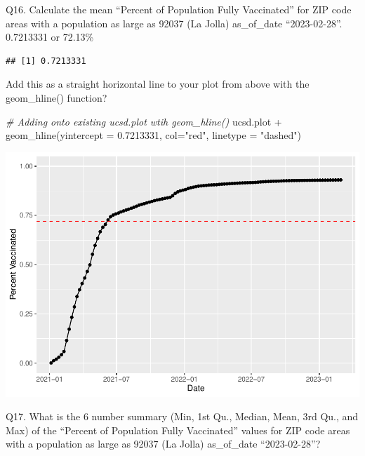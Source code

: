 \documentclass[
]{article}
\newenvironment{Shaded}{\begin{snugshade}}{\end{snugshade}}
\newcommand{\AttributeTok}[1]{\textcolor[rgb]{0.77,0.63,0.00}{#1}}
\newcommand{\CommentTok}[1]{\textcolor[rgb]{0.56,0.35,0.01}{\textit{#1}}}
\newcommand{\FloatTok}[1]{\textcolor[rgb]{0.00,0.00,0.81}{#1}}
\newcommand{\FunctionTok}[1]{\textcolor[rgb]{0.00,0.00,0.00}{#1}}
\newcommand{\NormalTok}[1]{#1}
\newcommand{\SpecialCharTok}[1]{\textcolor[rgb]{0.00,0.00,0.00}{#1}}
\newcommand{\StringTok}[1]{\textcolor[rgb]{0.31,0.60,0.02}{#1}}
\begin{document}
Q16. Calculate the mean ``Percent of Population Fully Vaccinated'' for
ZIP code areas with a population as large as 92037 (La Jolla)
as\_of\_date ``2023-02-28''. 0.7213331 or 72.13\%

\begin{Shaded}
\end{Shaded}

\begin{verbatim}
## [1] 0.7213331
\end{verbatim}

Add this as a straight horizontal line to your plot from above with the
geom\_hline() function?

\begin{Shaded}
\begin{Highlighting}[]
\CommentTok{\# Adding onto existing ucsd.plot wtih geom\_hline()}
\NormalTok{ucsd.plot }\SpecialCharTok{+} \FunctionTok{geom\_hline}\NormalTok{(}\AttributeTok{yintercept =} \FloatTok{0.7213331}\NormalTok{, }\AttributeTok{col=}\StringTok{"red"}\NormalTok{, }\AttributeTok{linetype =} \StringTok{"dashed"}\NormalTok{)}
\end{Highlighting}
\end{Shaded}

\includegraphics{Lab-17-MiniAssn_files/figure-latex/unnamed-chunk-28-1.pdf}

Q17. What is the 6 number summary (Min, 1st Qu., Median, Mean, 3rd Qu.,
and Max) of the ``Percent of Population Fully Vaccinated'' values for
ZIP code areas with a population as large as 92037 (La Jolla)
as\_of\_date ``2023-02-28''?
\end{document}
